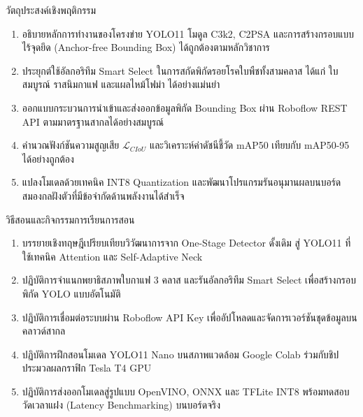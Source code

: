 \begin{planbox}{วัตถุประสงค์เชิงพฤติกรรม}
\begin{enumerate}[topsep=2pt, itemsep=1pt, partopsep=0pt, parsep=0pt, leftmargin=1.5em]
    \item อธิบายหลักการทำงานของโครงข่าย YOLO11 โมดูล C3k2, C2PSA และการสร้างกรอบแบบไร้จุดยึด (Anchor-free Bounding Box) ได้ถูกต้องตามหลักวิชาการ
    \item ประยุกต์ใช้อัลกอริทึม Smart Select ในการสกัดพิกัดรอยโรคใบพืชทั้งสามคลาส ได้แก่ ใบสมบูรณ์ ราสนิมกาแฟ และแผลไหม้โฟม่า ได้อย่างแม่นยำ
    \item ออกแบบกระบวนการนำเข้าและส่งออกข้อมูลพิกัด Bounding Box ผ่าน Roboflow REST API ตามมาตรฐานสากลได้อย่างสมบูรณ์
    \item คำนวณฟังก์ชันความสูญเสีย $\mathcal{L}_{CIoU}$ และวิเคราะห์ค่าดัชนีชี้วัด mAP50 เทียบกับ mAP50-95 ได้อย่างถูกต้อง
    \item แปลงโมเดลด้วยเทคนิค INT8 Quantization และพัฒนาโปรแกรมรันอนุมานผลบนบอร์ดสมองกลฝังตัวที่มีข้อจำกัดด้านพลังงานได้สำเร็จ
\end{enumerate}
\end{planbox}

\newpage

\begin{planbox}{วิธีสอนและกิจกรรมการเรียนการสอน}
\begin{enumerate}[topsep=2pt, itemsep=1pt, partopsep=0pt, parsep=0pt, leftmargin=1.5em]
    \item บรรยายเชิงทฤษฎีเปรียบเทียบวิวัฒนาการจาก One-Stage Detector ดั้งเดิม สู่ YOLO11 ที่ใช้เทคนิค Attention และ Self-Adaptive Neck
    \item ปฏิบัติการจำแนกพยาธิสภาพใบกาแฟ 3 คลาส และรันอัลกอริทึม Smart Select เพื่อสร้างกรอบพิกัด YOLO แบบอัตโนมัติ
    \item ปฏิบัติการเชื่อมต่อระบบผ่าน Roboflow API Key เพื่ออัปโหลดและจัดการเวอร์ชันชุดข้อมูลบนคลาวด์สากล
    \item ปฏิบัติการฝึกสอนโมเดล YOLO11 Nano บนสภาพแวดล้อม Google Colab ร่วมกับชิปประมวลผลกราฟิก Tesla T4 GPU
    \item ปฏิบัติการส่งออกโมเดลสู่รูปแบบ OpenVINO, ONNX และ TFLite INT8 พร้อมทดสอบวัดเวลาแฝง (Latency Benchmarking) บนบอร์ดจริง
\end{enumerate}
\end{planbox}

